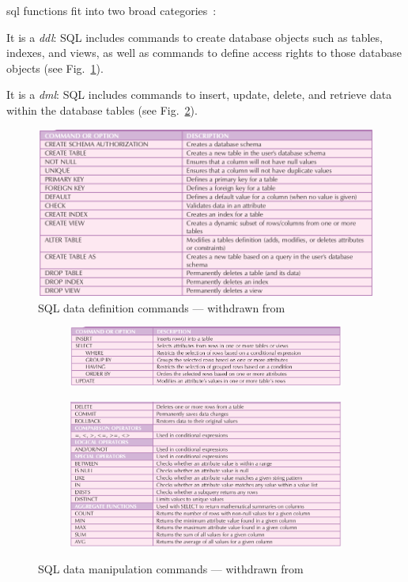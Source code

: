 \gls{sql} functions fit into two broad categories~\cite{coronel2016database}:
\begin{enum-c}
\item It is a \emph{\gls{ddl}}: SQL includes commands to create database objects
  such as tables, indexes, and views, as well as commands to define access
  rights to those database objects (see Fig.~\ref{fig:sql-dll}).
\item It is a \emph{\gls{dml}}: SQL includes commands to insert, update, delete,
  and retrieve data within the database tables (see Fig.~\ref{fig:sql-dml}).
\end{enum-c}
%
\begin{figure}[htb!]
\centering
    \includegraphics[width=0.9\columnwidth]{./img/sql-dll.png}
  \caption{SQL data definition commands --- withdrawn from~\cite{coronel2016database}}%
  \label{fig:sql-dll}
\end{figure}
%
\begin{figure}[htb!]
  \centering
  \begin{subfigure}[t]{.9\textwidth}
  \includegraphics[width=\textwidth]{img/sql-dml-1.png}%
\end{subfigure}
%
%
  \begin{subfigure}{.9\textwidth}
  \includegraphics[width=\textwidth]{img/sql-dml-2.png}%
\end{subfigure}
  \caption{SQL data manipulation commands --- withdrawn from~\cite{coronel2016database}}%
  \label{fig:sql-dml}
\end{figure}
